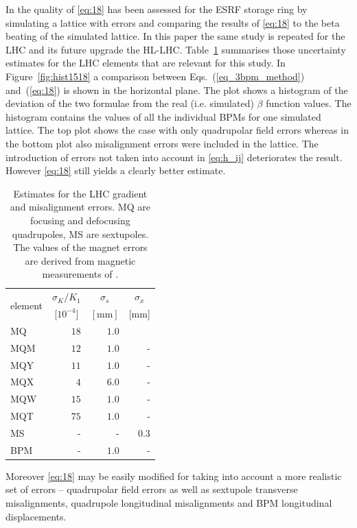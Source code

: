 In \cite{Franchi2016} the quality of \eqref{eq:18} has been assessed for the ESRF storage ring by
simulating a lattice with errors and comparing the results of \eqref{eq:18} to the beta beating of
the simulated lattice. In this paper the same study is repeated for the LHC and its future upgrade the HL-LHC.
Table~\ref{tab:unc_estimates} summarises those uncertainty estimates for the LHC elements that are
relevant for this study. 
In Figure~\ref{fig:hist1518} a comparison between Eqs.~(\ref{eq_3bpm_method}) and~(\ref{eq:18}) is shown
in the horizontal plane. The plot shows a histogram of the deviation of the two formulae
from the real (i.e. simulated) $ \beta $ function values. The histogram contains the values of all the
individual BPMs for one simulated lattice. The top plot shows the case with only quadrupolar field
errors whereas in the bottom plot also misalignment errors were included in the lattice. The introduction
of errors not taken into account in \eqref{eq:h_ij} deteriorates the result. However \eqref{eq:18}
still yields a clearly better estimate.


\begin{table}
	\centering
	\begin{tabular}{lrrr}
		\multirow{ 2}{*}{element} & \multicolumn{1}{c}{ $ \sigma_K/K_1 $ }&\multicolumn{1}{c}{ $ \sigma_s $ }&\multicolumn{1}{c}{ $ \sigma_x $}\\
		&\multicolumn{1}{c}{  [$ 10^{-4} $]} &\multicolumn{1}{c}{  $ [\text{mm}] $} &\multicolumn{1}{c}{  [mm]} \rule[-3mm]{0mm}{0mm} \\ 
		\hline
		MQ & $18  $ & $ 1.0   $ &\rule[5mm]{0mm}{0mm}\\
		MQM & $ 12 $ & $ 1.0   $ & -\\
		MQY & $ 11 $ & $ 1.0  $ & -\\
		MQX &  $4   $ & $ 6.0   $  & -\\
		MQW & $ 15  $ & $ 1.0   $  & -\\
		MQT & $ 75  $ & $ 1.0   $  & -\\
		MS & -& - & $ 0.3   $ \\
		BPM & -& $ 1.0   $ & - 
	\end{tabular}
    \caption{Estimates for the LHC gradient and misalignment errors. MQ are focusing and defocusing
    quadrupoles, MS are sextupoles.
    The values of the magnet errors are derived from magnetic measurements of \cite{wise1, wise2}.
    }
	\label{tab:unc_estimates}
\end{table}

Moreover \eqref{eq:18} may be easily modified for taking into account a more realistic set of errors -- quadrupolar field errors as well as sextupole transverse misalignments, quadrupole longitudinal misalignments and BPM longitudinal displacements. 


